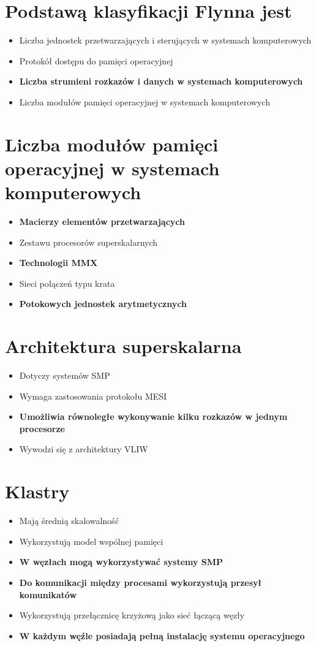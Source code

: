 \documentclass[a4paper,twoside]{article}
\begin{document}
\section{Podstawą klasyfikacji Flynna jest}
	\begin{itemize}
    \item Liczba jednostek przetwarzających i sterujących w systemach komputerowych
    \item Protokół dostępu do pamięci operacyjnej
    \item \textbf{Liczba strumieni rozkazów i danych w systemach komputerowych}
    \item Liczba modułów pamięci operacyjnej w systemach komputerowych
    \end{itemize}

\section{Liczba modułów pamięci operacyjnej w systemach komputerowych}
	\begin{itemize}
    \item \textbf{Macierzy elementów przetwarzających}
    \item Zestawu procesorów superskalarnych
    \item \textbf{Technologii MMX}
    \item Sieci połączeń typu krata
    \item \textbf{Potokowych jednostek arytmetycznych}
    \end{itemize}

\section{Architektura superskalarna}
	\begin{itemize}
    \item Dotyczy systemów SMP
    \item Wymaga zastosowania protokołu MESI
    \item \textbf{Umożliwia równoległe wykonywanie kilku rozkazów w jednym procesorze}
    \item Wywodzi się z architektury VLIW
    \end{itemize}

\section{Klastry}
	\begin{itemize}
    \item Mają średnią skalowalność
    \item Wykorzystują model wspólnej pamięci
    \item \textbf{W węzłach mogą wykorzystywać systemy SMP}
    \item \textbf{Do komunikacji między procesami wykorzystują przesył komunikatów}
    \item Wykorzystują przełącznicę krzyżową jako sieć łączącą węzły
    \item \textbf{W każdym węźle posiadają pełną instalację systemu operacyjnego}
    \end{itemize}
\end{document}
